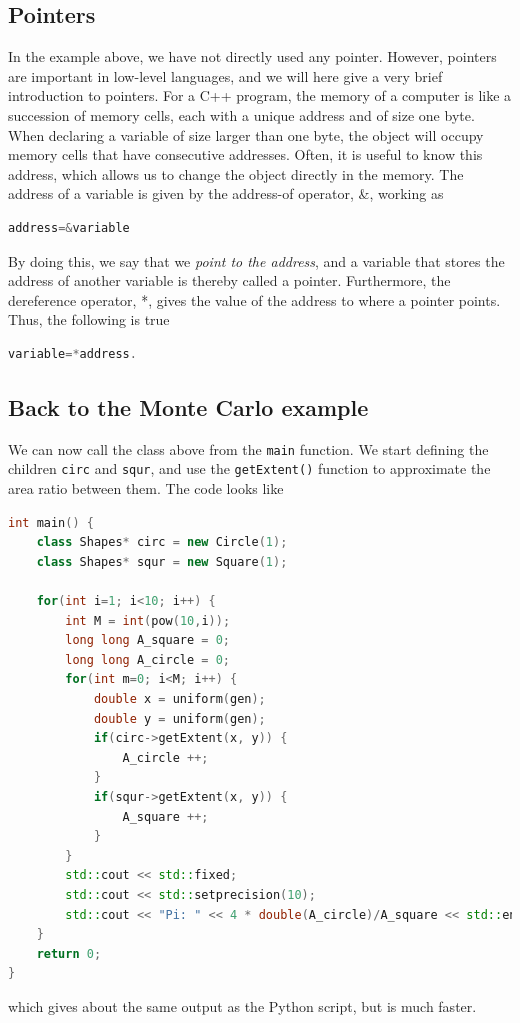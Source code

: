 \subsection{Pointers}
In the example above, we have not directly used any pointer. However, pointers are important in low-level languages, and we will here give a very brief introduction to pointers. For a C++ program, the memory of a computer is like a succession of memory cells, each with a unique address and of size one byte. When declaring a variable of size larger than one byte, the object will occupy memory cells that have consecutive addresses. Often, it is useful to know this address, which allows us to change the object directly in the memory. The address of a variable is given by the address-of operator, \&, working as
\lstset{basicstyle=\scriptsize}
\begin{lstlisting}[language=C++]
address=&variable
\end{lstlisting}
By doing this, we say that we \textit{point to the address}, and a variable that stores the address of another variable is thereby called a pointer. Furthermore, the dereference operator, *, gives the value of the address to where a pointer points. Thus, the following is true
\begin{lstlisting}[language=C++]
variable=*address.
\end{lstlisting}

\subsection{Back to the Monte Carlo example}
We can now call the class above from the \texttt{main} function. We start defining the children \texttt{circ} and \texttt{squr}, and use the \texttt{getExtent()} function to approximate the area ratio between them. The code looks like 
\begin{lstlisting}[language=c++]
int main() {   
	class Shapes* circ = new Circle(1);
	class Shapes* squr = new Square(1);

	for(int i=1; i<10; i++) {
		int M = int(pow(10,i));
		long long A_square = 0;
		long long A_circle = 0;
		for(int m=0; i<M; i++) {
			double x = uniform(gen);
			double y = uniform(gen);
			if(circ->getExtent(x, y)) {
				A_circle ++;
			}
			if(squr->getExtent(x, y)) {
				A_square ++;
			}
		}
		std::cout << std::fixed;
		std::cout << std::setprecision(10);
		std::cout << "Pi: " << 4 * double(A_circle)/A_square << std::endl;
	}
	return 0;
}
\end{lstlisting}
which gives about the same output as the Python script, but is much faster. 

